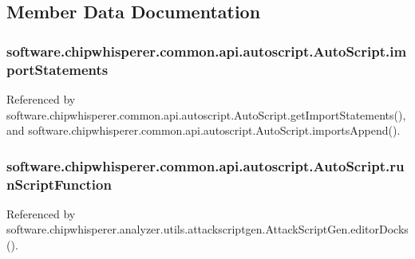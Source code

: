 \subsection{Member Data Documentation}
\hypertarget{classsoftware_1_1chipwhisperer_1_1common_1_1api_1_1autoscript_1_1AutoScript_ac16974ee6baa9b1293eef755635c333e}{}
\subsubsection[{import\+Statements}]{\setlength{\rightskip}{0pt plus 5cm}software.\+chipwhisperer.\+common.\+api.\+autoscript.\+Auto\+Script.\+import\+Statements}\label{classsoftware_1_1chipwhisperer_1_1common_1_1api_1_1autoscript_1_1AutoScript_ac16974ee6baa9b1293eef755635c333e}


Referenced by software.\+chipwhisperer.\+common.\+api.\+autoscript.\+Auto\+Script.\+get\+Import\+Statements(), and software.\+chipwhisperer.\+common.\+api.\+autoscript.\+Auto\+Script.\+imports\+Append().

\hypertarget{classsoftware_1_1chipwhisperer_1_1common_1_1api_1_1autoscript_1_1AutoScript_a0110bb83812414043606d3bea1317747}{}
\subsubsection[{run\+Script\+Function}]{\setlength{\rightskip}{0pt plus 5cm}software.\+chipwhisperer.\+common.\+api.\+autoscript.\+Auto\+Script.\+run\+Script\+Function}\label{classsoftware_1_1chipwhisperer_1_1common_1_1api_1_1autoscript_1_1AutoScript_a0110bb83812414043606d3bea1317747}


Referenced by software.\+chipwhisperer.\+analyzer.\+utils.\+attackscriptgen.\+Attack\+Script\+Gen.\+editor\+Docks().

